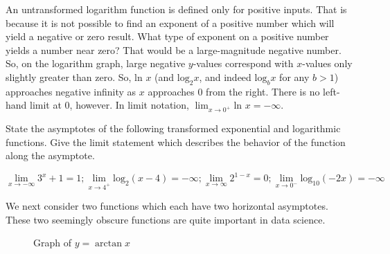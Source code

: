 An untransformed logarithm function is defined only for positive inputs. That is 
because it is not possible to find an exponent of a positive number which will 
yield a negative or zero result. What type of exponent on a positive number yields 
a number near zero? That would be a large-magnitude negative number. So, on the 
logarithm graph, large negative $y$-values correspond with $x$-values only slightly 
greater than zero. So, $\text{ln } x$ (and $\text{log}_2 x$, and indeed 
$\text{log}_b x$ for any $b > 1$) approaches negative infinity as $x$ approaches 
$0$ from the right. There is no left-hand limit at $0$, however. In limit notation, 
$\lim_{x \rightarrow 0^+} \text{ln } x = -\infty$.

\begin{Exercise}[title=Limits Practice 2, label=limits2]
  State the asymptotes of the following transformed exponential and logarithmic 
  functions. Give the limit statement which describes the behavior of the function 
  along the asymptote.
  \vspace{40mm}
\end{Exercise}
\begin{Answer}[ref=limits2] 
	$$ \lim_{x \rightarrow -\infty} 3^x + 1 = 1; \lim_{x \rightarrow 4^+} \text{log}_2 (x-4) = -\infty; \lim_{x \rightarrow \infty} 2^{1-x} = 0; \lim_{x \rightarrow 0^-} \text{log}_{10} (-2x) = -\infty $$
\end{Answer}

We next consider two functions which each have two horizontal asymptotes. These two 
seemingly obscure functions are quite important in data science.

\begin{figure}[htbp]
  \centering
  \caption{Graph of \(y = \arctan x\)}
\end{figure}

